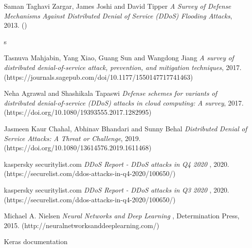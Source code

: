 \begin{thebibliography}{9}
     Saman Taghavi Zargar, James Joshi and David Tipper {\em A Survey of Defense Mechanisms Against Distributed Denial of Service (DDoS) Flooding Attacks}, 2013. ()

     s

     Tasnuva Mahjabin, Yang Xiao, Guang Sun and Wangdong Jiang {\em A survey of distributed denial-of-service attack, prevention, and mitigation techniques}, 2017. (https://journals.sagepub.com/doi/10.1177/1550147717741463)

     Neha Agrawal and Shashikala Tapaswi {\em Defense schemes for variants of distributed denial-of-service (DDoS) attacks in cloud
    computing: A survey}, 2017. (https://doi.org/10.1080/19393555.2017.1282995)

     Jasmeen Kaur Chahal, Abhinav Bhandari and Sunny Behal {\em Distributed Denial of Service Attacks: A Threat or Challenge}, 2019. (https://doi.org/10.1080/13614576.2019.1611468)

     kaspersky securitylist.com {\em DDoS Report - DDoS attacks in Q4 2020
    }, 2020. (https://securelist.com/ddos-attacks-in-q4-2020/100650/)
  
     kaspersky securitylist.com {\em DDoS Report - DDoS attacks in Q3 2020
    }, 2020. (https://securelist.com/ddos-attacks-in-q4-2020/100650/)    

     Michael A. Nielsen  {\em Neural Networks and Deep Learning }, Determination Press, 2015. (http://neuralnetworksanddeeplearning.com/)   

      Keras documentation 






\end{thebibliography}
